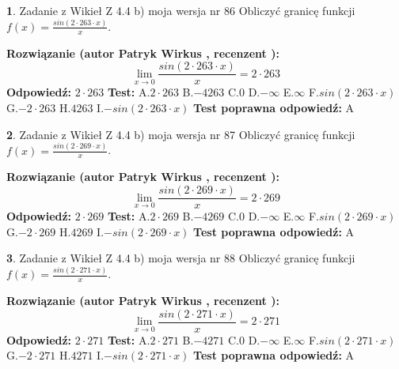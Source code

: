 \documentclass[12pt, a4paper]{article}
\theoremstyle{definition} %
\newtheorem{zad}{}
\newcommand{\zadStart}[1]{\begin{zad}#1\newline}
\newcommand{\zadStop}{\end{zad}}
\newcommand{\rozwStart}[2]{\noindent \textbf{Rozwiązanie (autor #1 , recenzent #2): }\newline}
\newcommand{\rozwStop}{\newline}
\newcommand{\odpStart}{\noindent \textbf{Odpowiedź:}\newline}
\newcommand{\odpStop}{\newline}
\newcommand{\testStart}{\noindent \textbf{Test:}\newline}
\newcommand{\testStop}{\newline}
\newcommand{\kluczStart}{\noindent \textbf{Test poprawna odpowiedź:}\newline}
\newcommand{\kluczStop}{\newline}
\begin{document}
\zadStart{Zadanie z Wikieł Z 4.4 b) moja wersja nr 86}
Obliczyć granicę funkcji $f(x)=\frac{sin(2 \cdot263\cdot x)}{x}$.
\zadStop
\rozwStart{Patryk Wirkus}{}
$$\lim\limits_{x\to 0}\frac{sin(2 \cdot 263\cdot x)}{x}=
2 \cdot 263$$
\rozwStop
\odpStart
$2 \cdot 263$
\odpStop
\testStart
A.$2 \cdot 263$
B.$-4263$
C.$0$
D.$-\infty$
E.$\infty$
F.$sin(2 \cdot 263\cdot x)$
G.$-2 \cdot 263$
H.$4263$
I.$-sin(2 \cdot 263\cdot x)$
\testStop
\kluczStart
A
\kluczStop



\zadStart{Zadanie z Wikieł Z 4.4 b) moja wersja nr 87}
Obliczyć granicę funkcji $f(x)=\frac{sin(2 \cdot269\cdot x)}{x}$.
\zadStop
\rozwStart{Patryk Wirkus}{}
$$\lim\limits_{x\to 0}\frac{sin(2 \cdot 269\cdot x)}{x}=
2 \cdot 269$$
\rozwStop
\odpStart
$2 \cdot 269$
\odpStop
\testStart
A.$2 \cdot 269$
B.$-4269$
C.$0$
D.$-\infty$
E.$\infty$
F.$sin(2 \cdot 269\cdot x)$
G.$-2 \cdot 269$
H.$4269$
I.$-sin(2 \cdot 269\cdot x)$
\testStop
\kluczStart
A
\kluczStop



\zadStart{Zadanie z Wikieł Z 4.4 b) moja wersja nr 88}
Obliczyć granicę funkcji $f(x)=\frac{sin(2 \cdot271\cdot x)}{x}$.
\zadStop
\rozwStart{Patryk Wirkus}{}
$$\lim\limits_{x\to 0}\frac{sin(2 \cdot 271\cdot x)}{x}=
2 \cdot 271$$
\rozwStop
\odpStart
$2 \cdot 271$
\odpStop
\testStart
A.$2 \cdot 271$
B.$-4271$
C.$0$
D.$-\infty$
E.$\infty$
F.$sin(2 \cdot 271\cdot x)$
G.$-2 \cdot 271$
H.$4271$
I.$-sin(2 \cdot 271\cdot x)$
\testStop
\kluczStart
A
\kluczStop
\end{document}
